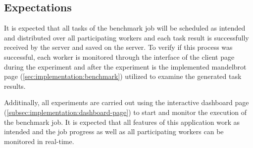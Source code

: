 \subsection{Expectations}
It is expected that all tasks of the benchmark job will be scheduled as intended and distributed over all participating workers and each task result is successfully received by the server and saved on the server. To verify if this process was successful, each worker is monitored through the interface of the client page during the experiment and after the experiment is the implemented mandelbrot page (\autoref{sec:implementation:benchmark}) utilized to examine the generated task results.

Additinally, all experiments are carried out using the interactive dashboard page (\autoref{subsec:implementation:dashboard-page}) to start and monitor the execution of the benchmark job. It is expected that all features of this application work as intended and the job progress as well as all participating workers can be monitored in real-time.

